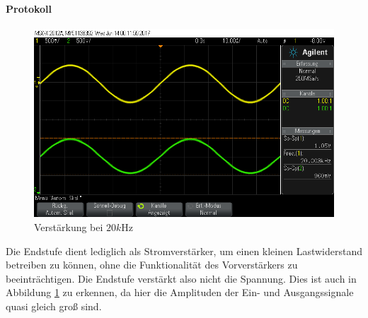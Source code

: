 \documentclass[10pt]{scrreprt}
\begin{document}
    \paragraph{Protokoll}
    \begin{figure}[H]
        \includegraphics[width=\textwidth]{scope_1.png}
        \caption{Verstärkung bei $20\si{k\hertz}$}
        \label{fig:Enstufe}
    \end{figure}

    Die Endstufe dient lediglich als Stromverstärker, um einen kleinen Lastwiderstand
    betreiben zu können, ohne die Funktionalität des Vorverstärkers zu beeinträchtigen.
    Die Endstufe verstärkt also nicht die Spannung. Dies ist auch in Abbildung
    \ref{fig:Enstufe} zu erkennen, da hier die Amplituden der Ein- und Ausgangssignale
    quasi gleich groß sind.
\end{document}
